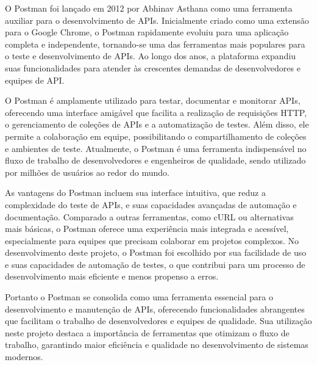 O Postman foi lançado em 2012 por Abhinav Asthana como uma ferramenta auxiliar para o desenvolvimento de APIs. Inicialmente criado como uma extensão para o Google Chrome, o Postman rapidamente evoluiu para uma aplicação completa e independente, tornando-se uma das ferramentas mais populares para o teste e desenvolvimento de APIs. Ao longo dos anos, a plataforma expandiu suas funcionalidades para atender às crescentes demandas de desenvolvedores e equipes de API.

O Postman é amplamente utilizado para testar, documentar e monitorar APIs, oferecendo uma interface amigável que facilita a realização de requisições HTTP, o gerenciamento de coleções de APIs e a automatização de testes. Além disso, ele permite a colaboração em equipe, possibilitando o compartilhamento de coleções e ambientes de teste. Atualmente, o Postman é uma ferramenta indispensável no fluxo de trabalho de desenvolvedores e engenheiros de qualidade, sendo utilizado por milhões de usuários ao redor do mundo.

As vantagens do Postman incluem sua interface intuitiva, que reduz a complexidade do teste de APIs, e suas capacidades avançadas de automação e documentação. Comparado a outras ferramentas, como cURL ou alternativas mais básicas, o Postman oferece uma experiência mais integrada e acessível, especialmente para equipes que precisam colaborar em projetos complexos. No desenvolvimento deste projeto, o Postman foi escolhido por sua facilidade de uso e suas capacidades de automação de testes, o que contribui para um processo de desenvolvimento mais eficiente e menos propenso a erros.

Portanto o Postman se consolida como uma ferramenta essencial para o desenvolvimento e manutenção de APIs, oferecendo funcionalidades abrangentes que facilitam o trabalho de desenvolvedores e equipes de qualidade. Sua utilização neste projeto destaca a importância de ferramentas que otimizam o fluxo de trabalho, garantindo maior eficiência e qualidade no desenvolvimento de sistemas modernos.